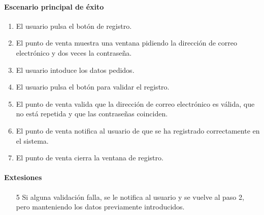   \paragraph{Escenario principal de éxito}
  \begin{enumerate}
    \item El usuario pulsa el botón de registro.
    \item El punto de venta muestra una ventana pidiendo la dirección de correo electrónico y dos veces la contraseña.
    \item El usuario intoduce los datos pedidos.
    \item El usuario pulsa el botón para validar el registro.
    \item El punto de venta valida que la dirección de correo electrónico es válida, que no está repetida y que las contraseñas coinciden.
    \item El punto de venta notifica al usuario de que se ha registrado correctamente en el sistema.
    \item El punto de venta cierra la ventana de registro.
  \end{enumerate}
  \paragraph{Extesiones}
  \begin{enumerate}
     \item[5] Si alguna validación falla, se le notifica al usuario y se vuelve al paso 2, pero manteniendo los datos previamente introducidos.
  \end{enumerate}


  

